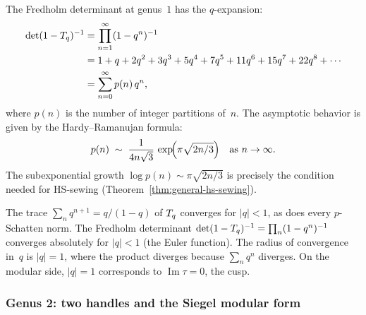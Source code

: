 \begin{computation}%
\label{comp:thqg-X-genus-1-series}%
%
The Fredholm determinant at genus~$1$ has the $q$-expansion:
\begin{align}
\det(1 - T_q)^{-1}
&= \prod_{n=1}^{\infty} (1 - q^n)^{-1}
\notag\\
&= 1 + q + 2q^2 + 3q^3 + 5q^4 + 7q^5 + 11q^6 + 15q^7
+ 22q^8 + \cdots
\notag\\
&= \sum_{n=0}^{\infty} p(n)\,q^n,
\label{eq:thqg-X-partition-numbers}
\end{align}
where $p(n)$ is the number of integer partitions of~$n$.
The asymptotic behavior is given by the Hardy--Ramanujan formula:
\begin{equation}\label{eq:thqg-X-hardy-ramanujan}
p(n) \;\sim\;
\frac{1}{4n\sqrt{3}}\,
\exp\!\Bigl(\pi\sqrt{2n/3}\Bigr)
\quad\text{as } n \to \infty.
\end{equation}
The subexponential growth $\log p(n) \sim \pi\sqrt{2n/3}$
is precisely the condition needed for HS-sewing
(Theorem~\ref{thm:general-hs-sewing}).
\end{computation}

\begin{remark}%
\label{rem:thqg-X-trace-vs-fredholm}%
The trace $\sum_n q^{n+1} = q/(1-q)$ of $T_q$ converges
for $|q| < 1$, as does every $p$-Schatten norm.
The Fredholm determinant
$\det(1 - T_q)^{-1}
= \prod_n (1 - q^n)^{-1}$
converges absolutely for $|q| < 1$ (the Euler function).
The radius of convergence in~$q$ is $|q| = 1$, where the
product diverges because $\sum_n q^n$ diverges.
On the modular side, $|q| = 1$ corresponds to
$\operatorname{Im}\tau = 0$, the cusp.
\end{remark}

\subsubsection{Genus 2: two handles and the Siegel modular form}


